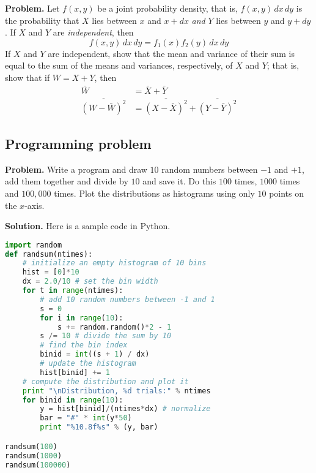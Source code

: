 \documentclass[twocolumn, 10pt]{article}
\numberwithin{equation}{section}
\newenvironment{problem}
{\par\medskip\sffamily \color{problue}
  \textbf{Problem. }\ignorespaces}
{\medskip}
\newenvironment{solution}
{\par\medskip
  \textbf{Solution. }\ignorespaces}
{\medskip}
\begin{document}
\begin{problem}
  Let $f(x, y)$ be a joint probability density,
  that is, $f(x, y)\, dx \, dy$
  is the probability that $X$ lies between $x$ and $x+dx$
  \emph{and}
  $Y$ lies between $y$ and $y + dy$.
  If $X$ and $Y$ are \emph{independent}, then
  $$
  f(x, y) \, dx \, dy = f_1(x) f_2(y) \, dx \, dy
  $$
  If $X$ and $Y$ are independent, show that the mean and variance
  of their sum is equal to the sum of the means and variances, respectively,
  of $X$ and $Y$;
  that is, show that if $W = X + Y$, then
  \begin{align*}
    \bar W &= \bar X + \bar Y \\
    \overline{ (W - \bar W)^2 } &=
    \overline{ (X - \bar X)^2 } +
    \overline{ (Y - \bar Y)^2 }
  \end{align*}
\end{problem}

\subsection{Programming problem}

\begin{problem}
Write a program and draw $10$ random numbers between $-1$ and $+1$,
add them together and divide by $10$ and save it.
Do this $100$ times, $1000$ times and $100,000$ times.
Plot the distributions as histograms using only $10$ points on the $x$-axis.
\end{problem}

\begin{solution}
Here is a sample code in Python.
\begin{lstlisting}[language=Python]
import random
def randsum(ntimes):
    # initialize an empty histogram of 10 bins
    hist = [0]*10
    dx = 2.0/10 # set the bin width
    for t in range(ntimes):
        # add 10 random numbers between -1 and 1
        s = 0
        for i in range(10):
            s += random.random()*2 - 1
        s /= 10 # divide the sum by 10
        # find the bin index
        binid = int((s + 1) / dx)
        # update the histogram
        hist[binid] += 1
    # compute the distribution and plot it
    print "\nDistribution, %d trials:" % ntimes
    for binid in range(10):
        y = hist[binid]/(ntimes*dx) # normalize
        bar = "#" * int(y*50)
        print "%10.8f%s" % (y, bar)

randsum(100)
randsum(1000)
randsum(100000)
\end{lstlisting}
\end{solution}
\end{document}
